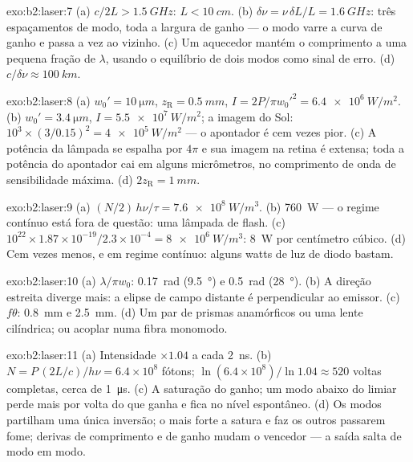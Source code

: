 \begin{solution}{exo:b2:laser:7}
(a) $c/2L > \qty{1.5}{GHz}$: $L < \qty{10}{cm}$. (b) $\delta\nu = \nu\,\delta L/L
= \qty{1.6}{GHz}$: três espaçamentos de modo, toda a largura de ganho --- o modo
varre a curva de ganho e passa a vez ao vizinho. (c) Um
aquecedor mantém o comprimento a uma pequena fração de $\lambda$, usando o
equilíbrio de dois modos como sinal de erro. (d) $c/\delta\nu \approx
\qty{100}{km}$.
\end{solution}

\begin{solution}{exo:b2:laser:8}
(a) $w_0' = \qty{10}{\micro m}$, $z_{\text{R}} = \qty{0.5}{mm}$, $I = 2P/\pi
w_0'^2 = \qty{6.4e6}{W/m^2}$. (b) $w_0' = \qty{3.4}{\micro m}$, $I =
\qty{5.5e7}{W/m^2}$; a imagem do Sol: $10^3 \times (3/0.15)^2 =
\qty{4e5}{W/m^2}$ --- o apontador é cem vezes pior. (c) A
potência da lâmpada se espalha por $4\pi$ e sua imagem na retina é extensa; toda a
potência do apontador cai em alguns micrômetros, no comprimento de onda
de sensibilidade máxima. (d) $2z_{\text{R}} = \qty{1}{mm}$.
\end{solution}

\begin{solution}{exo:b2:laser:9}
(a) $(N/2)\,h\nu/\tau = \qty{7.6e8}{W/m^3}$. (b) \qty{760}{W} --- o regime contínuo
está fora de questão: uma lâmpada de flash. (c) $10^{22} \times 1.87 \times
10^{-19}/2.3 \times 10^{-4} = \qty{8e6}{W/m^3}$: \qty{8}{W} por centímetro
cúbico. (d) Cem vezes menos, e em regime contínuo: alguns watts de
luz de diodo bastam.
\end{solution}

\begin{solution}{exo:b2:laser:10}
(a) $\lambda/\pi w_0$: \qty{0.17}{rad} (\qty{9.5}{\degree}) e \qty{0.5}{rad}
(\qty{28}{\degree}). (b) A direção estreita diverge mais: a
elipse de campo distante é perpendicular ao emissor. (c) $f\theta$:
\qty{0.8}{mm} e \qty{2.5}{mm}. (d) Um par de prismas anamórficos ou uma
lente cilíndrica; ou acoplar numa fibra monomodo.
\end{solution}

\begin{solution}{exo:b2:laser:11}
(a) Intensidade $\times 1.04$ a cada \qty{2}{ns}. (b) $N = P\,(2L/c)/h\nu =
6.4 \times 10^8$ fótons; $\ln(6.4 \times 10^8)/\ln 1.04 \approx 520$ voltas
completas, cerca de \qty{1}{\micro s}. (c) A saturação do ganho; um modo abaixo
do limiar perde mais por volta do que ganha e fica no
nível espontâneo. (d) Os modos partilham uma única inversão; o mais forte
a satura e faz os outros passarem fome; derivas de comprimento e de ganho mudam
o vencedor --- a saída salta de modo em modo.
\end{solution}


